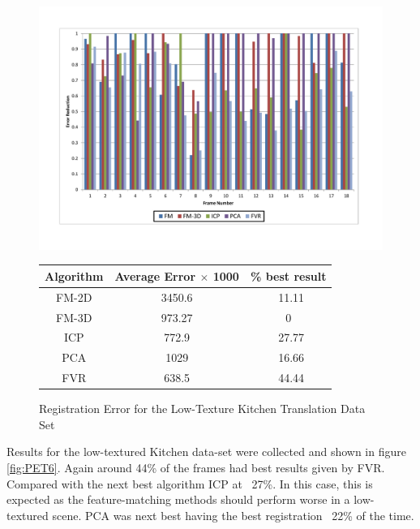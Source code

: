 \begin{figure}
\centering
\includegraphics[width=6in]{images/results/Kitchen_LittleTexture_Pan}
\caption{Registration Error for the Low-Texture Kitchen Translation Data Set}
\label{fig:PET6}

\begin{tabular}{ccc}
\hline
\textbf{Algorithm} & \textbf{Average Error $\times$ 1000} & \textbf{\% best result}\\ \hline
FM-2D	& 3450.6 & ~11.11\\
FM-3D	& 973.27 & 0\\
ICP		& 772.9 & ~27.77\\
PCA		& 1029 & ~16.66\\
FVR		& 638.5 & ~44.44\\
\end{tabular}
\label{tab:PET6ST}
\end{figure} 


Results for the low-textured Kitchen data-set were collected and shown in figure \ref{fig:PET6}. Again around 44\% of the frames had best results given by FVR. Compared with the next best algorithm ICP at ~27\%. In this case, this is expected as the feature-matching methods should perform worse in a low-textured scene. PCA was next best having the best registration ~22\% of the time. \\


